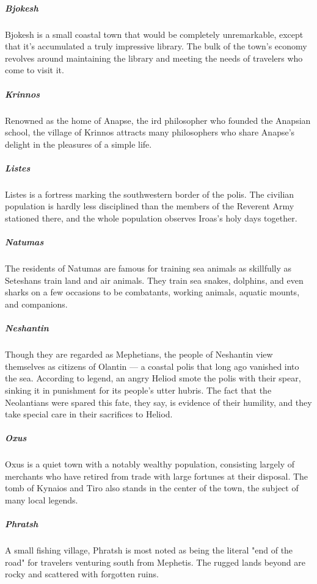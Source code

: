         \subparagraph{Bjokesh} Bjokesh is a small coastal town that would be completely unremarkable, except that it's accumulated a truly impressive library.
        The bulk of the town's economy revolves around maintaining the library and meeting the needs of travelers who come to visit it.

        \subparagraph{Krinnos} Renowned as the home of Anapse, the ird philosopher who founded the Anapsian school, the village of Krinnos attracts many philosophers who share Anapse's delight in the pleasures of a simple life.

        \subparagraph{Listes} Listes is a fortress marking the southwestern border of the polis.
        The civilian population is hardly less disciplined than the members of the Reverent Army stationed there, and the whole population observes Iroas's holy days together.

        \subparagraph{Natumas} The residents of Natumas are famous for training sea animals as skillfully as Seteshans train land and air animals.
        They train sea snakes, dolphins, and even sharks on a few occasions to be combatants, working animals, aquatic mounts, and companions.

        \subparagraph{Neshantin} Though they are regarded as Mephetians, the people of Neshantin view themselves as citizens of Olantin --- a coastal polis that long ago vanished into the sea.
        According to legend, an angry Heliod smote the polis with their spear, sinking it in punishment for its people's utter hubris.
        The fact that the Neolantians were spared this fate, they say, is evidence of their humility, and they take special care in their sacrifices to Heliod.


        \subparagraph{Oxus} Oxus is a quiet town with a notably wealthy population, consisting largely of merchants who have retired from trade with large fortunes at their disposal.
        The tomb of Kynaios and Tiro also stands in the center of the town, the subject of many local legends.

        \subparagraph{Phratsh} A small fishing village, Phratsh is most noted as being the literal "end of the road" for travelers venturing south from Mephetis.
        The rugged lands beyond are rocky and scattered with forgotten ruins.

